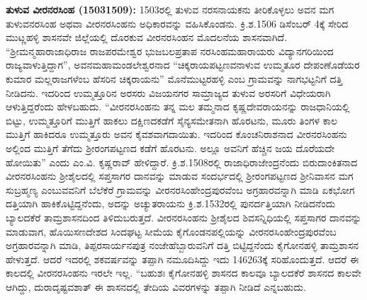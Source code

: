 \textbf{ತುಳುವ ವೀರನರಸಿಂಹ (15031509):} 1503ರಲ್ಲಿ ತುಳುವ ನರಸನಾಯಕನು ತೀರಿಕೊಳ್ಳಲು ಅವನ ಮಗ ತುಳುವನರಸಿಂಹ ಅಥವಾ ವೀರನರಸಿಂಹನು ಅಧಿಕಾರವನ್ನು ವಹಿಸಿಕೊಂಡನು. ಕ್ರಿ.ಶ.1506 ಡಿಸೆಂಬರ್​ 4ಕ್ಕೆ ಸೇರಿದ ಮುಟ್ಣಹಳ್ಳಿ ಶಾಸನವೇ ಜಿಲ್ಲೆಯಲ್ಲಿ ದೊರಕುವ ವೀರನರಸಿಂಹನ ಮೊದಲನೆಯ ಶಾಸನವಾಗಿದೆ. “ಶ‍್ರೀಮನ್ಮಹಾರಾಜಾಧಿರಾಜ ರಾಜಪರಮೇಶ್ವರ ಭುಜಬಲಪ್ರತಾಪ ನರಸಿಂಹಮಹಾರಾಯರು ವಿದ್ಯಾನಗರಿಯಿಂದ ರಾಜ್ಯವಾಳುತ್ತಿದ್ದಾಗ'', ಅವನ\break ಮಹಾಮಂಡಲೇಶ್ವರನಾದ “ಚಿಕ್ಕರಾಯಪಟ್ಟಣವನಾಳುವ ಉಮ್ಮತೂರ ದೇಪಂಣೊಡೆಯರ ಕುಮಾರ ಮಲ್ಲರಾಜಗಳೆಂಬ ಹೆಸರಿನ ಚಿಕ್ಕರಾಯನು'' ಮೊನೆಮುಟ್ಟರಹಳ್ಳಿ ಎಂಬ ಗ್ರಾಮವನ್ನು ನಾಗಭಟ್ಟನಿಗೆ ದತ್ತಿ ನೀಡಿದನು. ಇದರಿಂದ ಉಮ್ಮತ್ತೂರಿನ ಅರಸರು ವಿಜಯನಗರ ಸಾಮ್ರಾಜ್ಯದ ತುಳುವ ಅರಸರಿಗೆ ವಿಧೇಯರಾಗಿ ಆಳುತ್ತಿದ್ದರೆಂದು ಹೇಳಬಹುದು. “ವೀರನರಸಿಂಹನು ತನ್ನ ಮಲ ತಮ್ಮನಾದ ಕೃಷ್ಣದೇವರಾಯನನ್ನು ರಾಜಧಾನಿಯಲ್ಲಿ ಬಿಟ್ಟು, ಉಮ್ಮತ್ತೂರಿಗೆ ಮುತ್ತಿಗೆ ಹಾಕಲು ದಕ್ಷಿಣದಕಡೆಗೆ ಸೈನ್ಯಸಮೇತನಾಗಿ ಹೊರಟನು, ಮೂರು ತಿಂಗಳ ಕಾಲ ಮುತ್ತಿಗೆ ಹಾಕಿದರೂ ಉಮ್ಮತ್ತೂರು ಅವನ ಕೈವಶವಾಗದಾಯಿತು. ಇದರಿಂದ ಕೊಂಚನಿರಾಶನಾದ ವೀರನರಸಿಂಹನು ಅಲ್ಲಿಂದ ಮುತ್ತಿಗೆ ತೆಗೆದು ಶ‍್ರೀರಂಗಪಟ್ಟಣದ ಕಡೆಗೆ ಹೊರಟನು. ಅಲ್ಲೂ ಅವನಿಗೆ ಹೆಚ್ಚಿನ ಜಯ ದೊರೆಯದೇ ಹೋಯಿತು” ಎಂದು ಎಂ.ವಿ. ಕೃಷ್ಣರಾವ್​ ಹೇಳಿದ್ದಾರೆ. ಕ್ರಿ.ಶ.1508ರಲ್ಲಿ ರಾಜಾಧಿರಾಜೇಂದ್ರನೆಂದು ಬಿರುದಾಂಕಿತನಾದ ವೀರನರಸಿಂಹನು ಶ‍್ರೀಶೈಲದಲ್ಲಿ ಸಪ್ತಸಾಗರ ದಾನವನ್ನು ಮಾಡುವ ಸಂದರ್ಭದಲ್ಲಿ ಶ‍್ರೀರಂಗಪಟ್ಟಣದ ಶ‍್ರೀನಿವಾಸನ ಮಗ ಸುಬ್ರಹ್ಮಣ್ಯ ಎಂಬುವವನಿಗೆ ಬೆಲೆಕೆರೆ ಗ್ರಾಮವನ್ನು ವೀರನರಸಿಂಹೇಂದ್ರಪುರವೆಂಬ ಅಗ್ರಹಾರವನ್ನಾಗಿ ಮಾಡಿ ಏಕಭೋಗ ದತ್ತಿಯಾಗಿ ಹಾಕಿಕೊಟ್ಟಿದ್ದನೆಂದು, ಅದನ್ನು ಅಚ್ಯುತರಾಯನು ಕ್ರಿ.ಶ.1532ರಲ್ಲಿ ಪುನರ್ದತ್ತಿಯಾಗಿ ನೀಡಿದನೆಂದು ಬ್ಯಾಲದಕೆರೆ ತಾಮ್ರಶಾಸನದಿಂದ ತಿಳಿದುಬರುತ್ತದೆ. ವೀರನರಸಿಂಹನು ಶ‍್ರೀಶೈಲದ ಶಿವಸನ್ನಿಧಿಯಲ್ಲಿ ಸಪ್ತಸಾಗರ ದಾನವನ್ನು ಮಾಡುವಾಗ, ಹೊಯಿಸಣದೇಶದ ಸಿಂದಘಟ್ಟ ಸೀಮೆಯ ಕೈಗೊಂಡನಪಲ್ಲಿಯನ್ನು ವೀರನರಸಿಂಹೇಂದ್ರಪುರವೆಂಬ ಅಗ್ರಹಾರವನ್ನಾಗಿ ಮಾಡಿ, ತಿಪ್ಪರಸಾರ್ಯನಪುತ್ರ ನಂಜೇಹೆಬ್ಬಾರುವನಿಗೆ ದತ್ತಿ ಬಿಟ್ಟಿದ್ದನೆಂದು ಕೈಗೋನಹಳ್ಳಿ ತಾಮ್ರಶಾಸನ ಹೇಳುತ್ತದೆ. ಆದರೆ ಇದರಲ್ಲಿ ಶಕವರ್ಷವನ್ನು ತಪ್ಪಾಗಿ ನಮೂದಿಸಿದ್ದು ಇದು 146263ಕ್ಕೆ ಸರಿಹೊಂದುತ್ತದೆ. ಆದರೆ ಈ ಕಾಲದಲ್ಲಿ ವೀರನರಸಿಂಹನು ಇರಲೇ ಇಲ್ಲ. “ಬಹುಶಃ ಕೈಗೋನಹಳ್ಳಿ ಶಾಸನದ ಕಾಲವೂ ಬ್ಯಾಲದಕೆರೆ ಶಾಸನದ ಕಾಲವೇ ಆಗಿದ್ದು, ದುರಾದೃಷ್ಟವಶಾತ್​ ಈ ಶಾಸನದಲ್ಲಿ ತೇದಿಯ ವಿವರಗಳನ್ನು ತಪ್ಪಾಗಿ ನೀಡಿದೆ ಎನ್ನಬಹುದು.

